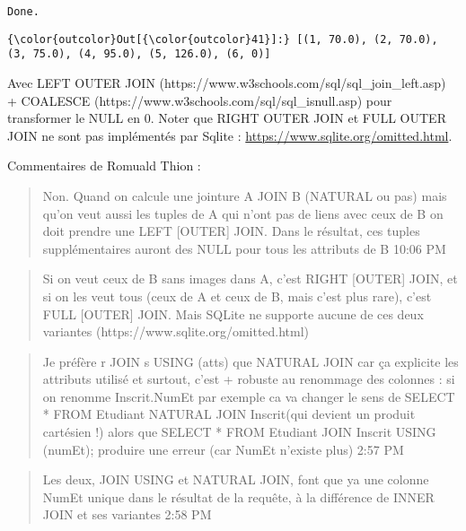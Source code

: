 \documentclass[11pt]{article}
\begin{document}
    \begin{Verbatim}[commandchars=\\\{\}]
Done.

    \end{Verbatim}

\begin{Verbatim}[commandchars=\\\{\}]
{\color{outcolor}Out[{\color{outcolor}41}]:} [(1, 70.0), (2, 70.0), (3, 75.0), (4, 95.0), (5, 126.0), (6, 0)]
\end{Verbatim}
            
    Avec LEFT OUTER JOIN (https://www.w3schools.com/sql/sql\_join\_left.asp)
+ COALESCE (https://www.w3schools.com/sql/sql\_isnull.asp) pour
transformer le NULL en 0. Noter que RIGHT OUTER JOIN et FULL OUTER JOIN
ne sont pas implémentés par Sqlite :
\url{https://www.sqlite.org/omitted.html}.

Commentaires de Romuald Thion :

\begin{quote}
Non. Quand on calcule une jointure A JOIN B (NATURAL ou pas) mais qu'on
veut aussi les tuples de A qui n'ont pas de liens avec ceux de B on doit
prendre une LEFT {[}OUTER{]} JOIN. Dans le résultat, ces tuples
supplémentaires auront des NULL pour tous les attributs de B 10:06 PM
\end{quote}

\begin{quote}
Si on veut ceux de B sans images dans A, c'est RIGHT {[}OUTER{]} JOIN,
et si on les veut tous (ceux de A et ceux de B, mais c'est plus rare),
c'est FULL {[}OUTER{]} JOIN. Mais SQLite ne supporte aucune de ces deux
variantes (https://www.sqlite.org/omitted.html)
\end{quote}

\begin{quote}
Je préfère r JOIN s USING (atts) que NATURAL JOIN car ça explicite les
attributs utilisé et surtout, c'est + robuste au renommage des colonnes
: si on renomme Inscrit.NumEt par exemple ca va changer le sens de
SELECT * FROM Etudiant NATURAL JOIN Inscrit(qui devient un produit
cartésien !) alors que SELECT * FROM Etudiant JOIN Inscrit USING
(numEt); produire une erreur (car NumEt n'existe plus) 2:57 PM
\end{quote}

\begin{quote}
Les deux, JOIN USING et NATURAL JOIN, font que ya une colonne NumEt
unique dans le résultat de la requête, à la différence de INNER JOIN et
ses variantes 2:58 PM
\end{quote}
\end{document}
